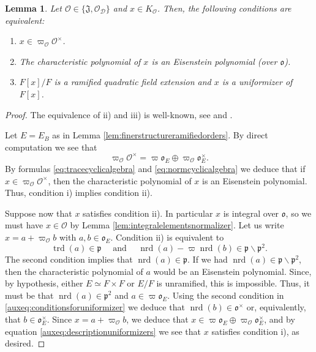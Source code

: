 \documentclass{article}
\newtheorem{lem}{Lemma}[section]
\theoremstyle{named}
\newcommand{\D}{\mathcal{D}}
\newcommand{\J}{\mathfrak{J}}
\renewcommand{\O}{\mathcal{O}}
\renewcommand{\o}{\mathfrak{o}}
\newcommand{\p}{\mathfrak{p}}
\DeclareMathOperator{\nrd}{nrd}
\DeclareMathOperator{\trd}{trd}
\begin{document}
\begin{lem}\label{lem:descriptionuniformizers}
Let $\O \in \{\J, \O_\D\}$ and $x \in K_\O$. Then, the following conditions are equivalent:
\begin{enumerate}
    \item [i)] $x \in \varpi_\O \O^\times$.
    \item [ii)] The characteristic polynomial of $x$ is an Eisenstein polynomial (over $\o$).
    \item [iii)] $F[x]/F$ is a ramified quadratic field extension and $x$ is a uniformizer of $F[x]$.
\end{enumerate}
\end{lem}
\begin{proof}
The equivalence of ii) and iii) is well-known, see \cite[Proposition 17]{serrelocalfields} and \cite[Proposition 18]{serrelocalfields}.

Let $E = E_B$ as in Lemma \ref{lem:finerstructureramifiedorders}. By direct computation we see that
\begin{equation}\label{auxeq:descriptionuniformizers}
\varpi_\O \O^\times = \varpi \o_E \oplus \varpi_\O \o_{E}^\times.
\end{equation} 
By formulas \eqref{eq:tracecyclicalgebra} and \eqref{eq:normcyclicalgebra} we deduce that if $x \in \varpi_\O \O^\times$, then the characteristic polynomial of $x$ is an Eisenstein polynomial. Thus, condition i) implies condition ii). 

Suppose now that $x$ satisfies condition ii). In particular $x$ is integral over $\o$, so we must have $x \in \O$ by Lemma \ref{lem:integralelementsnormalizer}. Let us write $x = a + \varpi_\O b$ with $a, b \in \o_E$. Condition ii) is equivalent to  
\begin{equation}\label{auxeq:conditionsforuniformizer}
    \trd(a) \in \p \quad \text{ and } \quad \nrd(a) - \varpi \nrd(b) \in \p \smallsetminus \p^2.
\end{equation}
The second condition implies that $\nrd(a) \in \p$. If we had $\nrd(a) \in \p \smallsetminus \p^2$, then the characteristic polynomial of $a$ would be an Eisenstein polynomial. Since, by hypothesis, either $E \simeq F\times F$ or $E/F$ is unramified, this is impossible. Thus, it must be that $\nrd(a) \in \p^2$ and $a\in \varpi \o_E$. Using the second condition in  \eqref{auxeq:conditionsforuniformizer} we deduce that $\nrd(b) \in \o^\times$ or, equivalently, that $b \in \o_E^\times$. Since $x = a + \varpi_\O b$, we deduce that $x \in \varpi \o_E \oplus \varpi_\O \o_{E}^\times$, and by equation \eqref{auxeq:descriptionuniformizers} we see that $x$ satisfies condition i), as desired.
\end{proof}
\end{document}
